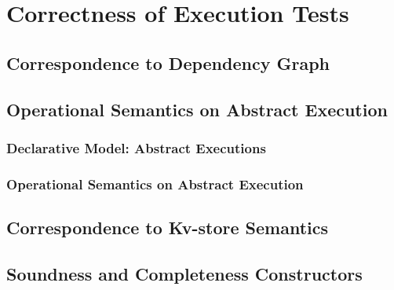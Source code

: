 \makeatletter
{}
\makeatother
\section{Correctness of Execution Tests}
\label{sec:relation}
\label{sec:sound-complete}



\subsection{Correspondence to Dependency Graph}
    
    \label{sec:dgraph} 
        \label{sec:dgraph-model} 
                    \label{sec:dgraph-isomorphism-kvstore}
                    
                    
\subsection{Operational Semantics on Abstract Execution}
    \label{sec:aexec}  
    \subsubsection{Declarative Model: Abstract Executions} 
                    \label{sec:aexec-model} 
    \subsubsection{Operational Semantics on Abstract Execution} 
                    \label{sec:aexec-semantics} 
                    \label{sec:aexec-op-semantics-and-axiom} 

\subsection{Correspondence to Kv-store Semantics}
    \label{sec:kv-aexec-trace-equivalent}
                    \label{sec:aexec-vs-kv-store} 
                    \label{sec:et-trace-to-aexec} 
                    \label{sec:aexec-to-et-trace} 

\subsection{Soundness and Completeness Constructors}
            \label{sec:sound-complete-constructor} 
            \label{sec:sound-constructor} 
            \label{sec:complete-constructor} 

